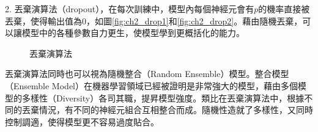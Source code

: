 \begin{itemize}
2. 丟棄演算法（dropout），在每次訓練中，模型內每個神經元會有$p$的機率直接被丟棄，使得輸出值為0，如圖\ref{fig:ch2_drop1}和\ref{fig:ch2_drop2}。藉由隨機丟棄，可以讓模型中的各種參數自力更生，使模型學到更概括化的能力。

\begin{figure}[ht]
\centering
{}
\caption{丟棄演算法}
\end{figure}
	丟棄演算法同時也可以視為隨機整合（Random Ensemble）模型。整合模型
	（Ensemble Model）在機器學習領域已經被證明是非常強大的模型，藉由多個模型的多樣性（Diversity）各司其職，提昇模型強度。類比在丟棄演算法中，根據不同的丟棄情況，有不同的神經元組合互相整合而成。隨機性造就了多樣性，又同時控制調適，使得模型更不容易過度貼合。


\end{itemize}
